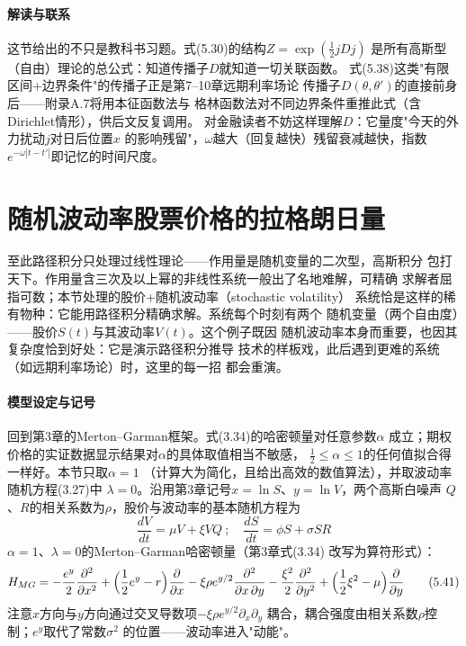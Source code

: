 \paragraph{解读与联系}
这节给出的不只是教科书习题。式(5.30)的结构$Z=\exp(\frac{1}{2}jDj)$
是所有高斯型（自由）理论的总公式：知道传播子$D$就知道一切关联函数。
式(5.38)这类"有限区间+边界条件"的传播子正是第7--10章远期利率场论
传播子$D(\theta,\theta')$的直接前身后——附录A.7将用本征函数法与
格林函数法对不同边界条件重推此式（含Dirichlet情形），供后文反复调用。
对金融读者不妨这样理解$D$：它量度"今天的外力扰动$j$对日后位置$x$
的影响残留"，$\omega$越大（回复越快）残留衰减越快，指数
$e^{-\omega|t-t'|}$即记忆的时间尺度。

\section{随机波动率股票价格的拉格朗日量}

至此路径积分只处理过线性理论——作用量是随机变量的二次型，高斯积分
包打天下。作用量含三次及以上幂的非线性系统一般出了名地难解，可精确
求解者屈指可数；本节处理的股价+随机波动率（stochastic volatility）
系统恰是这样的稀有物种：它能用路径积分精确求解。系统每个时刻有两个
随机变量（两个自由度）——股价$S(t)$与其波动率$V(t)$。这个例子既因
随机波动率本身而重要，也因其复杂度恰到好处：它是演示路径积分推导
技术的样板戏，此后遇到更难的系统（如远期利率场论）时，这里的每一招
都会重演。

\paragraph{模型设定与记号}
回到第3章的Merton--Garman框架。式(3.34)的哈密顿量对任意参数$\alpha$
成立；期权价格的实证数据显示结果对$\alpha$的具体取值相当不敏感，
$\frac{1}{2}\leq\alpha\leq1$的任何值拟合得一样好。本节只取$\alpha=1$
（计算大为简化，且给出高效的数值算法），并取波动率随机方程(3.27)中
$\lambda=0$。沿用第3章记号$x=\ln S$、$y=\ln V$，两个高斯白噪声
$Q$、$R$的相关系数为$\rho$，股价与波动率的基本随机方程为
\begin{equation*}
\frac{dV}{dt}=\mu V+\xi VQ\ ;\quad
\frac{dS}{dt}=\phi S+\sigma SR
\tag{5.40}
\end{equation*}
$\alpha=1$、$\lambda=0$的Merton--Garman哈密顿量（第3章式(3.34)
改写为算符形式）：
\begin{align*}
H_{MG}=-\frac{e^{y}}{2}\frac{\partial^{2}}{\partial x^{2}}
+\Bigl(\frac{1}{2}e^{y}-r\Bigr)\frac{\partial}{\partial x}
-\xi\rho e^{y/2}\frac{\partial^{2}}{\partial x\,\partial y}
-\frac{\xi^{2}}{2}\frac{\partial^{2}}{\partial y^{2}}
+\Bigl(\frac{1}{2}\xi^{2}-\mu\Bigr)\frac{\partial}{\partial y}
\tag{5.41}
\end{align*}
注意$x$方向与$y$方向通过交叉导数项$-\xi\rho e^{y/2}\partial_{x}\partial_{y}$
耦合，耦合强度由相关系数$\rho$控制；$e^{y}$取代了常数$\sigma^{2}$
的位置——波动率进入"动能"。

